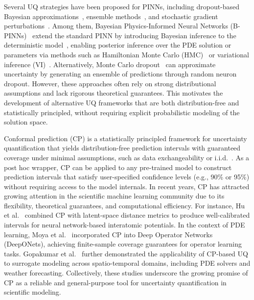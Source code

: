 \documentclass[preprint,12pt]{elsarticle}
\begin{document}
Several UQ strategies have been proposed for PINNs, including dropout-based Bayesian approximations~\cite{alhajeri_physics-informed_2022}, ensemble methods~\cite{haitsiukevich_improved_2023}, and stochastic gradient perturbations~\cite{???}. Among them, Bayesian Physics-Informed Neural Networks (B-PINNs)~\cite{yang_b-pinns_2021} extend the standard PINN by introducing Bayesian inference to the deterministic model~\cite{linka_bayesian_2022}, enabling posterior inference over the PDE solution or parameters via methods such as Hamiltonian Monte Carlo (HMC)~\cite{yang_b-pinns_2021, neal_bayesian_nn_2012} or variational inference (VI)~\cite{yang_b-pinns_2021, blundell_weight_2015}. Alternatively, Monte Carlo dropout~\cite{gal_dropout_2016} can approximate uncertainty by generating an ensemble of predictions through random neuron dropout. However, these approaches often rely on strong distributional assumptions and lack rigorous theoretical guarantees. This motivates the development of alternative UQ frameworks that are both distribution-free and statistically principled, without requiring explicit probabilistic modeling of the solution space.

Conformal prediction (CP) is a statistically principled framework for uncertainty quantification that yields distribution-free prediction intervals with guaranteed coverage under minimal assumptions, such as data exchangeability or i.i.d.~\cite{shafer2008tutorial, angelopoulos2023conformal}. As a post hoc wrapper, CP can be applied to any pre-trained model to construct prediction intervals that satisfy user-specified confidence levels (e.g., 90\% or 95\%) without requiring access to the model internals. In recent years, CP has attracted growing attention in the scientific machine learning community due to its flexibility, theoretical guarantees, and computational efficiency. For instance, Hu et al.~\cite{hu_robust_2022} combined CP with latent-space distance metrics to produce well-calibrated intervals for neural network-based interatomic potentials. In the context of PDE learning, Moya et al.~\cite{moya_conformalized-deeponet_2025} incorporated CP into Deep Operator Networks (DeepONets), achieving finite-sample coverage guarantees for operator learning tasks. Gopakumar et al.~\cite{gopakumar_uncertainty_2024} further demonstrated the applicability of CP-based UQ to surrogate modeling across spatio-temporal domains, including PDE solvers and weather forecasting. Collectively, these studies underscore the growing promise of CP as a reliable and general-purpose tool for uncertainty quantification in scientific modeling.
\end{document}
